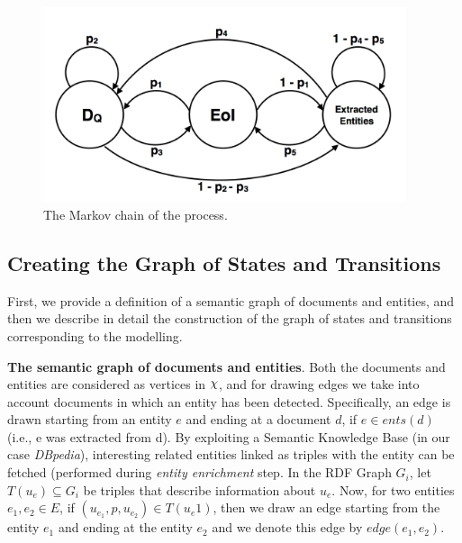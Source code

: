 \documentclass{article}
\DeclareRobustCommand{\rchi}{{\mathpalette\irchi\relax}}
\newcommand{\irchi}[2]{\raisebox{\depth}{$#1\chi$}}
\begin{document}
\begin{figure}[ht]
\begin{mdframed}
	\centering
	\includegraphics[width=0.95\textwidth]{markov_chain}
\end{mdframed}
	\caption{The Markov chain of the process.}
	\label{fig:markov_chain}
\end{figure}


\subsection{Creating the Graph of States and Transitions}
First, we provide a definition of a semantic graph of documents and entities, 
and then we describe in detail the construction of the graph of states and 
transitions corresponding to the modelling.

\vspace{2mm}\noindent 
{\bf The semantic graph of documents and entities}. Both the documents and 
entities are considered as vertices in $\rchi$, 
and for drawing edges we take into account documents in which an entity
has been detected. Specifically, an edge is drawn starting from an entity $e$ 
and ending at a document $d$, if $e \in ents(d)$ (i.e., e was extracted from d). 
By exploiting a Semantic Knowledge Base (in our case {\em DBpedia}), interesting 
related entities linked as triples with the entity can be fetched 
(performed during {\em entity enrichment} step. In the RDF Graph $G_i$, let $T(u_e) \subseteq G_i$ be triples that describe information about $u_e$. 
Now, for two entities $e_1, e_2 \in E$, if $(u_{e_1}, p, u_{e_2}) \in T(u_e1)$, 
then we draw an edge starting from the entity $e_1$ and ending at the entity $e_2$
and we denote this edge by $edge(e_1, e_2)$.
\end{document}
